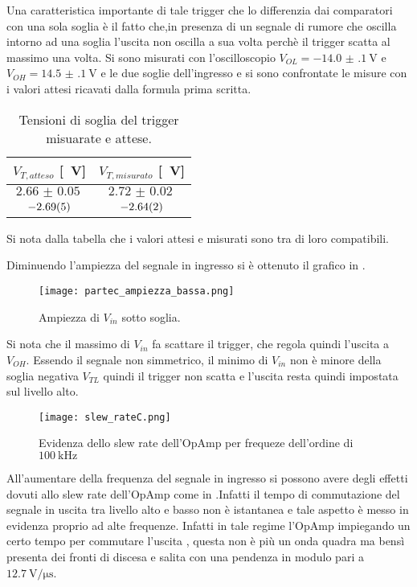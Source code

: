 Una caratteristica importante di tale trigger che lo differenzia dai comparatori con una sola soglia è il fatto che,in presenza di un segnale di rumore che oscilla intorno ad una soglia l'uscita non oscilla a sua volta perchè il trigger scatta al massimo una volta.
Si sono misurati con l'oscilloscopio $V_{OL}= \SI{-14.0(1)}{\V}$ e  $V_{OH}= \SI{14.5(1)}{\V}$ e le due soglie dell'ingresso e si sono confrontate le misure con i valori attesi ricavati dalla formula prima scritta.
\begin{table}[h]
	\centering
	\begin{tabular}{ *{2}{S[table-figures-exponent = 2]} }
		{$V_{T,atteso}$ [\SI{}{\V}]} & {$V_{T,misurato}$ [\SI{}{\V}]} \\
		\midrule
		 $\SI{2.66(5)}{}$	&	$\SI{2.72(2)}{}$	\\
		$\SI{-2.69 (5)}{}$	&	$\SI{-2.64 (2)}{}$	\\
	\end{tabular}
	\caption{Tensioni di soglia del trigger misuarate e attese.}
	\label{t:trigg_soglia}
\end{table}
Si nota dalla tabella che i valori attesi e misurati sono tra di loro compatibili.

Diminuendo l'ampiezza del segnale in ingresso si è ottenuto il grafico in .
\begin{figure}[h]
	\centering
	\texttt{[image: partec\_ampiezza\_bassa.png]}
	\caption{Ampiezza di $V_{in}$ sotto soglia. }
	\label{f:sotto_soglia}
\end{figure}

Si nota che il massimo di $V_{in}$ fa scattare il trigger, che regola quindi l'uscita a $V_{OH}$. Essendo il segnale non simmetrico, il minimo di $V_{in}$ non è minore della soglia negativa $V_{TL}$ quindi il trigger non scatta e l'uscita resta quindi impostata sul livello alto.

\begin{figure}[h]
	\centering
	\texttt{[image: slew\_rateC.png]}
	\caption{Evidenza dello slew rate dell'OpAmp per frequeze dell'ordine di $\SI{100}{\kHz}$}
	\label{f:slew_rate}
\end{figure}

All'aumentare della frequenza del segnale in ingresso si possono avere degli effetti dovuti allo slew rate dell'OpAmp come in .Infatti il tempo di commutazione del segnale in uscita tra livello alto e basso non è istantanea e tale aspetto è messo in evidenza proprio ad alte frequenze. Infatti in tale regime l'OpAmp impiegando un certo tempo per commutare l'uscita , questa non è più un onda quadra ma bensì presenta dei fronti di discesa e salita con una pendenza in modulo pari a $\SI{12.7}{\volt\per\micro\s}$.
